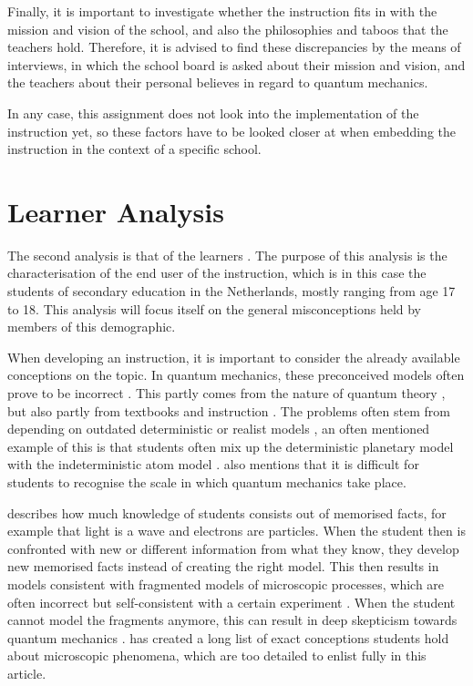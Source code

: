 \documentclass[11pt,twoside]{report} %
\begin{document}
Finally, it is important to investigate whether the instruction fits in with the mission and vision of the school, and also the philosophies and taboos that the teachers hold. Therefore, it is advised to find these discrepancies by the means of interviews, in which the school board is asked about their mission and vision, and the teachers about their personal believes in regard to quantum mechanics.

In any case, this assignment does not look into the implementation of the instruction yet, so these factors have to be looked closer at when embedding the instruction in the context of a specific school.


\section{Learner Analysis}
\label{sec:learneranalysis}

The second analysis is that of the learners \cite{smithragan}. The purpose of this analysis is the characterisation of the end user of the instruction, which is in this case the students of secondary education in the Netherlands, mostly ranging from age 17 to 18. This analysis will focus itself on the general misconceptions held by members of this demographic.

When developing an instruction, it is important to consider the already available conceptions on the topic. In quantum mechanics, these preconceived models often prove to be incorrect \cite{asikainen, papaphotis2, thacker}. This partly comes from the nature of quantum theory \cite{papaphotis2}, but also partly from textbooks and instruction \cite{hubber, papaphotis2}. The problems often stem from depending on outdated deterministic or realist models \cite{hubber, papaphotis1, papaphotis2}, an often mentioned example of this is that students often mix up the deterministic planetary model with the indeterministic atom model \cite{dori, henriksen, hubber, muller, papaphotis1, papaphotis2}.  also mentions that it is difficult for students to recognise the scale in which quantum mechanics take place.

 describes how much knowledge of students consists out of memorised facts, for example that light is a wave and electrons are particles. When the student then is confronted with new or different information from what they know, they develop new memorised facts instead of creating the right model. This then results in models consistent with fragmented models of microscopic processes, which are often incorrect but self-consistent with a certain experiment \cite{hubber, thacker}. When the student cannot model the fragments anymore, this can result in deep skepticism towards quantum mechanics \cite{barnes, henriksen, levrini}.  has created a long list of exact conceptions students hold about microscopic phenomena, which are too detailed to enlist fully in this article.
\end{document}
